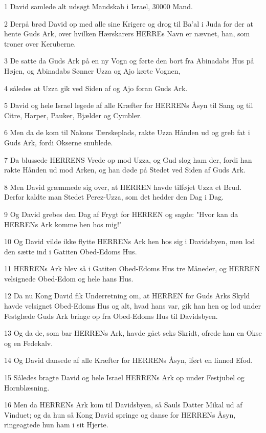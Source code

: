 \par 1 David samlede alt udsøgt Mandskab i Israel, 30000 Mand.
\par 2 Derpå brød David op med alle sine Krigere og drog til Ba'al i Juda for der at hente Guds Ark, over hvilken Hærskarers HERREs Navn er nævnet, han, som troner over Keruberne.
\par 3 De satte da Guds Ark på en ny Vogn og førte den bort fra Abinadabs Hus på Højen, og Abinadabs Sønner Uzza og Ajo kørte Vognen,
\par 4 således at Uzza gik ved Siden af og Ajo foran Guds Ark.
\par 5 David og hele Israel legede af alle Kræfter for HERRENs Åsyn til Sang og til Citre, Harper, Pauker, Bjælder og Cymbler.
\par 6 Men da de kom til Nakons Tærskeplads, rakte Uzza Hånden ud og greb fat i Guds Ark, fordi Okserne snublede.
\par 7 Da blussede HERRENS Vrede op mod Uzza, og Gud slog ham der, fordi han rakte Hånden ud mod Arken, og han døde på Stedet ved Siden af Guds Ark.
\par 8 Men David græmmede sig over, at HERREN havde tilføjet Uzza et Brud. Derfor kaldte man Stedet Perez-Uzza, som det hedder den Dag i Dag.
\par 9 Og David grebes den Dag af Frygt for HERREN og sagde: "Hvor kan da HERRENs Ark komme hen hos mig!"
\par 10 Og David vilde ikke flytte HERRENs Ark hen hos sig i Davidsbyen, men lod den sætte ind i Gatiten Obed-Edoms Hus.
\par 11 HERRENs Ark blev så i Gatiten Obed-Edoms Hus tre Måneder, og HERREN velsignede Obed-Edom og hele hans Hus.
\par 12 Da nu Kong David fik Underretning om, at HERREN for Guds Arks Skyld havde velsignet Obed-Edoms Hus og alt, hvad hans var, gik han hen og lod under Festglæde Guds Ark bringe op fra Obed-Edoms Hus til Davidsbyen.
\par 13 Og da de, som bar HERRENs Ark, havde gået seks Skridt, ofrede han en Okse og en Fedekalv.
\par 14 Og David dansede af alle Kræfter for HERRENs Åsyn, iført en linned Efod.
\par 15 Således bragte David og hele Israel HERRENs Ark op under Festjubel og Hornblæsning.
\par 16 Men da HERRENs Ark kom til Davidsbyen, så Sauls Datter Mikal ud af Vinduet; og da hun så Kong David springe og danse for HERRENs Åsyn, ringeagtede hun ham i sit Hjerte.
